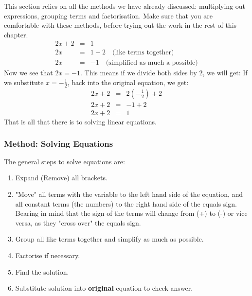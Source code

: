 \documentclass[10pt,a4paper,titlepage,twoside,openright]{report}
\begin{document}
This section relies on all the methods we have already discussed: multiplying
out expressions, grouping terms and factorisation. Make sure that you are
comfortable with these methods, before trying out the work in the rest of this
chapter.
\begin{eqnarray*}
2x+2&=&1\\
2x&=&1-2\quad\mbox{(like terms together)}\\
2x&=&-1\quad\mbox{(simplified as much a possible)}
\end{eqnarray*}
Now we see that $2x=-1$. This means if we divide both sides by 2, we will get:
If we substitute $x=-\frac{1}{2}$, back into the original equation, we get:
\begin{eqnarray*}
2x+2&=&2(-\frac{1}{2})+2\\
2x+2&=&-1+2\\
2x+2&=&1
\end{eqnarray*}
That is all that there is to solving linear equations.


\subsubsection{Method: Solving Equations}
{The general steps to solve equations are:
\vspace{0.5cm}
\begin{enumerate}
\item{Expand (Remove) all brackets.}
\item{"Move" all terms with the variable to the left hand side of the equation, and
all constant terms (the numbers) to the right hand side of the equals sign.
Bearing in mind that the sign of the terms will change from (+) to (-) or vice
versa, as they "cross over" the equals sign.}
\item{Group all like terms together and simplify as much as possible.}
\item{Factorise if necessary.}
\item{Find the solution.}
\item{Substitute solution into \textbf{original} equation to check answer.}
\end{enumerate}}
\end{document}
